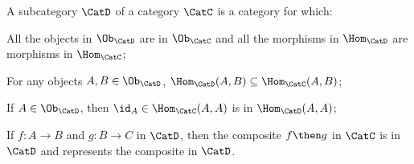 \begin{ctdefinition}
A subcategory $\CatD$ of a category $\CatC$ is a category for which:
\begin{compactenum}
    \item All the objects in $\Ob_\CatD$ are in $\Ob_\CatC$ and all the morphisms in $\Hom_\CatD$ are morphisms in $\Hom_\CatC$;
    \item For any objects $A,B\in \Ob_\CatD$, $\Hom_\CatD(A,B)\subseteq \Hom_\CatC(A,B)$;
    \item If $A\in \Ob_\CatD$, then $\id_A\in \Hom_\CatC(A,A)$ is in $\Hom_\CatD(A,A)$;
    \item If $f\colon A\to B$ and $g\colon B\to C$ in $\CatD$, then the composite $f\then g$ in $\CatC$ is in $\CatD$ and represents the composite in $\CatD$.
\end{compactenum}
\end{ctdefinition}

\begin{comment}
\begin{ctdefinition}[Subcategory]
\label{def:subcategory}
	Given a category~$\Cat{C}$, a \emph{subcategory}~$\Cat{B}$ consists of a subcollection of the collection of objects and morphisms of~$\Cat{C}$ such that:
	\begin{enumerate}[(i)]
	\item If a morphism~$f \colon x\to y$ is in $\Cat{B}$, then so are the objects~$x$ and~$y$.
	\item If the morphisms~$f\colon x\to y$ and~$g\colon y\to z$ are in~$\Cat{B}$, then so is their composite~$f\then g\colon x\to z$.
	\item If~$x$ is in~$\Cat{B}$, then so is the identity morphism~$\text{id}_x$.
	\end{enumerate}
\end{ctdefinition} 
\end{comment}




